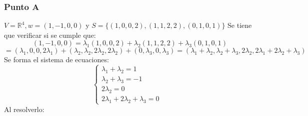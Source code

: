 \documentclass[a4paper,12pt]{article}
\begin{document}
\subsubsection{Punto A}
$V = \mathds{R}^4, w=(1,-1,0,0)$ y $S=\{ (1,0,0,2), (1,1,2,2), (0,1,0,1)\}$
\newline Se tiene que verificar si se cumple que:
$$
(1,-1,0,0) = \lambda_1(1,0,0,2)+\lambda_2(1,1,2,2)+\lambda_3(0,1,0,1)
$$
$$
= (\lambda_1,0,0,2\lambda_1) + (\lambda_2,\lambda_2,2\lambda_2, 2\lambda_2) + (0,\lambda_3,0,\lambda_3) = (\lambda_1+\lambda_2,\lambda_2+\lambda_3,2\lambda_2,2\lambda_1+2\lambda_2+\lambda_3)
$$
Se forma el sistema de ecuaciones:
$$
\begin{cases}
\lambda_1+\lambda_2 = 1 & \\ 
\lambda_2+\lambda_3 = -1 & \\ 
2\lambda_2 = 0& \\ 
2\lambda_1+2\lambda_2+\lambda_3 = 0 & 
\end{cases}
$$
Al resolverlo:
\end{document}
